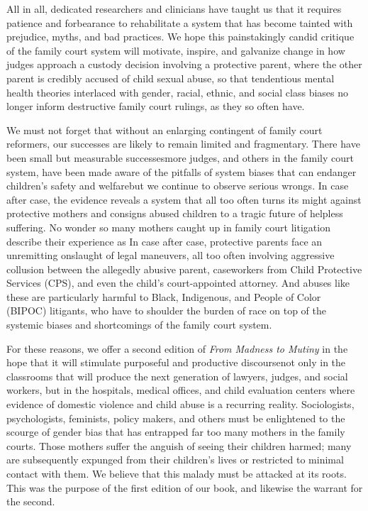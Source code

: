 All in all, dedicated researchers and clinicians have taught us that it requires patience and forbearance to rehabilitate a system that has become
tainted with prejudice, myths, and bad practices. We hope this
painstakingly candid critique of the family court system will motivate,
inspire, and galvanize change in how judges approach a custody decision 
involving a protective parent, where the other parent is credibly accused
of child sexual abuse, so that tendentious mental health theories 
interlaced with gender, racial, ethnic, and social class biases no longer inform
destructive family court rulings, as they so often have. \pfl{}

We must not forget that without an enlarging contingent of family
court reformers, our successes are likely to remain limited and 
fragmentary.  There have been small but measurable successes\mdash{}more 
judges, and others in the family court system, have been made aware of the pitfalls
of system biases that can endanger children's safety and 
welfare\mdash{}but
we continue to observe serious wrongs. In case after case, the evidence
reveals a system that all too often turns its might against protective
mothers and consigns abused children to a tragic future of helpless suffering. 
No wonder so many mothers caught up in family court litigation
describe their experience as  In case after case, protective 
parents face an unremitting onslaught of legal maneuvers, all
too often involving aggressive collusion between the allegedly abusive
parent, caseworkers from Child Protective Services (CPS), and even the
child’s court-appointed attorney. And abuses like these are particularly
harmful to Black, Indigenous, and People of Color (BIPOC) litigants, who
have to shoulder the burden of race on top of the systemic biases and
shortcomings of the family court system. \pfl{}

For these reasons, we offer a second edition of \textit{From Madness to
Mutiny} in the hope that it will stimulate purposeful and productive 
discourse\mdash{}not only in the classrooms that will produce the next generation of lawyers,
judges, and social workers, but in the hospitals, medical offices, 
and child evaluation centers where evidence of domestic violence and child abuse 
is a recurring reality. Sociologists, psychologists, feminists, policy makers,
and others must be enlightened to the scourge of gender bias that has
entrapped far too many mothers in the family courts. Those mothers suffer the anguish of seeing their children harmed; many are subsequently
expunged from their children's lives or restricted to minimal contact
with them. We believe that this malady
must be attacked at its roots. This was the purpose of the first edition of
our book, and likewise the warrant for the second. \pfl{}


